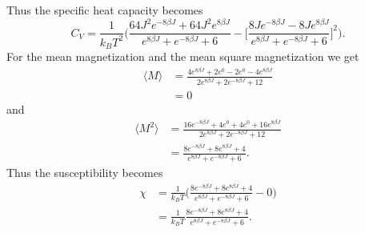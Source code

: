 \documentclass[notitlepage, reprint, nofootinbib]{revtex4-1}
\begin{document}
Thus the specific heat capacity becomes 
\begin{equation*} C_V=\frac{1}{k_BT^2}\Big(\frac{64J^2e^{-8\beta J} + 64J^2e^{8\beta J}}{e^{8\beta J}+e^{-8\beta J}+6} - \Big[\frac{8Je^{-8\beta J} - 8Je^{8\beta J}}{e^{8\beta J}+e^{-8\beta J}+6}\Big]^2\Big).\end{equation*}
For the mean magnetization and the mean square magnetization we get 
\begin{align*}
	\langle M\rangle &= \frac{4e^{8\beta J}+2e^0-2e^0-4e^{8\beta J}}{2e^{8\beta J}+2e^{-8\beta J}+12}\\
	&=0
\end{align*}
and
\begin{align*}
	\langle M^2 \rangle &=\frac{16e^{-8\beta J}+4e^0+4e^0+16e^{8\beta J}}{2e^{8\beta J}+2e^{-8\beta J}+12}\\
	&= \frac{8e^{-8\beta J}+8e^{8\beta J}+4}{e^{8\beta J}+e^{-8\beta J}+6}.
\end{align*}
Thus the susceptibility becomes 
\begin{align*}
	\chi &= \frac{1}{k_BT}\Big(\frac{8e^{-8\beta J}+8e^{8\beta J}+4}{e^{8\beta J}+e^{-8\beta J}+6} - 0\Big)\\
	&=\frac{1}{k_BT} \frac{8e^{-8\beta J}+8e^{8\beta J}+4}{e^{8\beta J}+e^{-8\beta J}+6}.
\end{align*}
\end{document}

